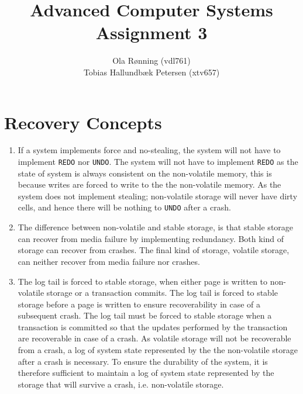 \documentclass[a4paper]{article}
\author{Ola Rønning (vdl761) \\ Tobias Hallundbæk Petersen (xtv657)}
\title{Advanced Computer Systems \\ Assignment 3}
\begin{document}
\maketitle
\section{Recovery Concepts}
\begin{enumerate}
\item If a system implements force and no-stealing, the system will not have to implement \texttt{REDO} nor \texttt{UNDO}. The system will not have to implement \texttt{REDO} as the state of system is always consistent on the non-volatile memory, this is because writes are forced to write to the the non-volatile memory. As the system does not implement stealing; non-volatile storage will never have dirty cells, and hence there will be nothing to \texttt{UNDO} after a crash.
\item The difference between non-volatile and stable storage, is that stable storage can recover from media failure by implementing redundancy. Both kind of storage can recover from crashes. The final kind of storage, volatile storage, can neither recover from media failure nor crashes.
\item The log tail is forced to stable storage, when either page is written to non-volatile storage or a transaction commits. The log tail is forced to stable storage before a page is written to ensure recoverability in case of a subsequent crash. The log tail must be forced to stable storage when a transaction is committed so that the updates performed by the transaction are recoverable in case of a crash. As volatile storage will not be recoverable from a crash, a log of system state represented by the the non-volatile storage after a crash is necessary. To ensure the durability of the system, it is therefore sufficient to maintain a log of system state represented by the storage that will survive a crash, i.e. non-volatile storage.
\end{enumerate}
\end{document}
